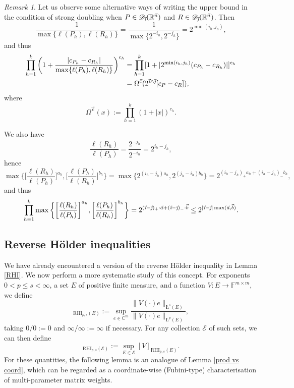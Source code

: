 \documentclass[11pt, reqno]{amsart}
\theoremstyle{definition}
\theoremstyle{remark}
\newtheorem{remark}[theorem]{Remark}
\numberwithin{equation}{section}
\newcommand{\C}{\mathbb C}
\newcommand{\D}{\mathscr D}
\newcommand{\Es}{\mathscr E}
\newcommand{\F}{\mathbb F}
\newcommand{\R}{\mathbb R}
\newcommand{\va}{\vec a}
\newcommand{\vb}{\vec b}
\newcommand{\vc}{\vec c}
\newcommand{\vi}{\vec{\textit{\i}}}
\newcommand{\vj}{\vec{\textit{\j}}}
\newcommand{\vn}{\vec n}
\newcommand{\aveL}{\textit{\L}}
\newcommand{\abs}[1]{|#1|}
\newcommand{\Norm}[2]{\|#1\|_{#2}}
\newcommand{\RHI}{\mathrm{RHI}}
\begin{document}
\begin{remark}\label{str doubling}
Let us observe some alternative ways of writing the upper bound in the condition of strong doubling when $P\in\D_{\vi}(\R^{\vn})$ and $R\in\D_{\vj}(\R^{\vn})$. Then
\begin{equation*}
\frac{1}{\max\{\ell(P_h),\ell(R_h)\}}=\frac{1}{\max\{2^{-i_h},2^{-j_h}\}}=2^{\min(i_h,j_h)},
\end{equation*}
and thus
\begin{equation*}
\begin{split}
\prod_{h=1}^k\bigg(1+\frac{\abs{c_{P_h}-c_{R_h}}}{\max\{\ell(P_h),\ell(R_h)\}}\bigg)^{c_h}
&=\prod_{h=1}^k[1+\abs{2^{\min(i_h,j_h)}(c_{P_h}-c_{R_h})}]^{c_h} \\
&=\Omega^{\vc}(2^{\vi\wedge\vj}[c_P-c_R]),
\end{split}
\end{equation*}
where
\begin{equation}\label{omega}
\Omega^{\vc}(x):=\prod_{h=1}^k(1+\abs{x})^{c_h}.
\end{equation}

We also have
\begin{equation*}
\frac{\ell(R_h)}{\ell(P_h)}=\frac{2^{-j_h}}{2^{-i_h}}=2^{i_h-j_h},
\end{equation*}
hence
\begin{equation*}
\max\bigg\{\bigg[\frac{\ell(R_h)}{\ell(P_h)}\bigg]^{a_h},\bigg[\frac{\ell(P_h)}{\ell(R_h)}\bigg]^{b_h}\bigg\}
=\max\{2^{(i_h-j_h)a_h},2^{(j_h-i_h)b_h}\}
=2^{(i_h-j_h)_+a_h+(i_h-j_h)_- b_h},
\end{equation*}
and thus
\begin{equation*}
\prod_{h=1}^k\max\bigg\{\bigg[\frac{\ell(R_h)}{\ell(P_h)}\bigg]^{a_h},
\bigg[\frac{\ell(P_h)}{\ell(R_h)}\bigg]^{b_h}\bigg\}
=2^{(\vi-\vj)_+\cdot\va+(\vi-\vj)_-\cdot\vb}
\leq 2^{\abs{\vi-\vj}\max(\va,\vb)}.
\end{equation*}
\end{remark}

\subsection{Reverse H\"older inequalities} \label{reverse}

We have already encountered a version of the reverse H\"older inequality in Lemma \ref{RHI}. We now perform a more systematic study of this concept. For exponents $0<p\leq s<\infty$, a set $E$ of positive finite measure, and a function $V:E\to\F^{m\times m}$, we define
\begin{equation*}
[V]_{\RHI_{p,s}(E)}:=\sup_{e\in\C^m}\frac{\Norm{V(\cdot)e}{\aveL^s(E)}}{\Norm{V(\cdot)e}{\aveL^p(E)}},
\end{equation*}
taking $0/0:=0$ and $\infty/\infty:=\infty$ if necessary. For any collection $\Es$ of such sets, we can then define
\begin{equation*}
[V]_{\RHI_{p,s}(\Es)}:=\sup_{E\in\Es}[V]_{\RHI_{p,s}(E)}.
\end{equation*}
For these quantities, the following lemma is an analogue
of Lemma \ref{prod vs coord}, which can be regarded as a coordinate-wise (Fubini-type)
characterisation of multi-parameter matrix weights.
\end{document}
